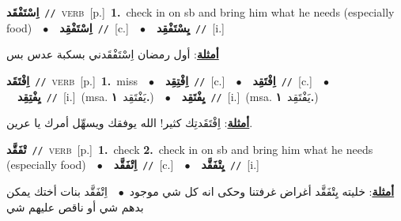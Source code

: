 \documentclass[10pt,a4paper,twoside]{article} %
\begin{document}
\begin{multicols}{2}
{\setlength\topsep{0pt}\textbf{\foreignlanguage{arabic}{اِسْتَفْقَد}}\ {\color{gray}\texttt{//}\color{black}}\ \textsc{verb}\ [p.]\ \textbf{1.}~check in on sb and bring him what he needs (especially food)\ \ $\bullet$\ \ \setlength\topsep{0pt}\textbf{\foreignlanguage{arabic}{اِسْتَفْقِد}}\ {\color{gray}\texttt{//}\color{black}}\ [c.]\ \ $\bullet$\ \ \setlength\topsep{0pt}\textbf{\foreignlanguage{arabic}{يِسْتَفْقِد}}\ {\color{gray}\texttt{//}\color{black}}\ [i.]\  \begin{flushright}\color{gray}\foreignlanguage{arabic}{\textbf{\underline{\foreignlanguage{arabic}{أمثلة}}}: أول رمضان اِسْتَفْقَدني بسكبة عدس بس}\end{flushright}\color{black}} \vspace{2mm}

{\setlength\topsep{0pt}\textbf{\foreignlanguage{arabic}{اِفْتَقَد}}\ {\color{gray}\texttt{//}\color{black}}\ \textsc{verb}\ [p.]\ \textbf{1.}~miss\ \ $\bullet$\ \ \setlength\topsep{0pt}\textbf{\foreignlanguage{arabic}{اِفْتِقِد}}\ {\color{gray}\texttt{//}\color{black}}\ [c.]\ \ $\bullet$\ \ \setlength\topsep{0pt}\textbf{\foreignlanguage{arabic}{اِفْتَقِد}}\ {\color{gray}\texttt{//}\color{black}}\ [c.]\ \ $\bullet$\ \ \setlength\topsep{0pt}\textbf{\foreignlanguage{arabic}{يِفْتِقِد}}\ {\color{gray}\texttt{//}\color{black}}\ [i.]\ \color{gray}(msa. \foreignlanguage{arabic}{يَفْتَقِد}~\foreignlanguage{arabic}{\textbf{١.}})\color{black}\ \ $\bullet$\ \ \setlength\topsep{0pt}\textbf{\foreignlanguage{arabic}{يِفْتَقِد}}\ {\color{gray}\texttt{//}\color{black}}\ [i.]\ \color{gray}(msa. \foreignlanguage{arabic}{يَفْتَقِد}~\foreignlanguage{arabic}{\textbf{١.}})\color{black}\  \begin{flushright}\color{gray}\foreignlanguage{arabic}{\textbf{\underline{\foreignlanguage{arabic}{أمثلة}}}: اِفْتَقَدتِك كثير! الله يوفقك ويسهِّل أمرك يا عرين.}\end{flushright}\color{black}} \vspace{2mm}

{\setlength\topsep{0pt}\textbf{\foreignlanguage{arabic}{تْفَقَّد}}\ {\color{gray}\texttt{//}\color{black}}\ \textsc{verb}\ [p.]\ \textbf{1.}~check  \textbf{2.}~check in on sb and bring him what he needs (especially food)\ \ $\bullet$\ \ \setlength\topsep{0pt}\textbf{\foreignlanguage{arabic}{اِتْفَقَّد}}\ {\color{gray}\texttt{//}\color{black}}\ [c.]\ \ $\bullet$\ \ \setlength\topsep{0pt}\textbf{\foreignlanguage{arabic}{يِتْفَقَّد}}\ {\color{gray}\texttt{//}\color{black}}\ [i.]\  \begin{flushright}\color{gray}\foreignlanguage{arabic}{\textbf{\underline{\foreignlanguage{arabic}{أمثلة}}}: خليته يِتْفَقَّد أغراض غرفتنا وحكى انه كل شي موجود\ $\bullet$\ \  اِتْفَقَّد بنات أختك يمكن بدهم شي أو ناقص عليهم شي}\end{flushright}\color{black}} \vspace{2mm}


\end{multicols}
\end{document}
